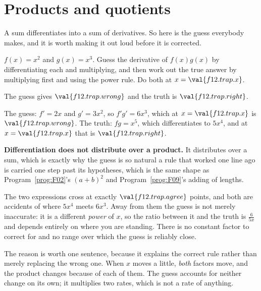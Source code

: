 \section{Products and quotients}
\label{sec:F12-product}

\begin{fr}
A sum differentiates into a sum of derivatives. So here is the guess everybody
makes, and it is worth making it out loud before it is corrected.

$f(x) = x^{2}$ and $g(x) = x^{3}$. Guess the derivative of $f(x)g(x)$ by
differentiating each and multiplying, and then work out the true answer by
multiplying first and using the power rule. Do both at $x = \val{f12.trap.x}$.
\dotline
\nextframe
\end{fr}

\begin{fr}
\begin{ansblock}
The guess gives $\val{f12.trap.wrong}$ and the truth is
$\val{f12.trap.right}$.
\end{ansblock}

The guess: $f' = 2x$ and $g' = 3x^{2}$, so $f'g' = 6x^{3}$, which at
$x = \val{f12.trap.x}$ is $\val{f12.trap.wrong}$. The truth: $fg = x^{5}$,
which differentiates to $5x^{4}$, and at $x = \val{f12.trap.x}$ that is
$\val{f12.trap.right}$.

\begin{trapbox}
\textbf{Differentiation does not distribute over a product.} It distributes
over a sum, which is exactly why the guess is so natural \dash{} a rule that
worked one line ago is carried one step past its hypotheses, which is the same
shape as Program~\ref{prog:F02}'s $(a+b)^{2}$ and
Program~\ref{prog:F09}'s adding of lengths.

The two expressions cross at exactly $\val{f12.trap.agree}$ points, and both
are accidents of where $5x^{4}$ meets $6x^{3}$. Away from them the guess is
not merely inaccurate: it is a different \emph{power} of $x$, so the ratio
between it and the truth is $\frac{6}{5x}$ and depends entirely on where you
are standing. There is no constant factor to correct for and no range over
which the guess is reliably close.

The reason is worth one sentence, because it explains the correct rule rather
than merely replacing the wrong one. When $x$ moves a little, \emph{both}
factors move, and the product changes because of each of them. The guess
accounts for neither change on its own; it multiplies two rates, which is not
a rate of anything.
\end{trapbox}
\end{fr}

